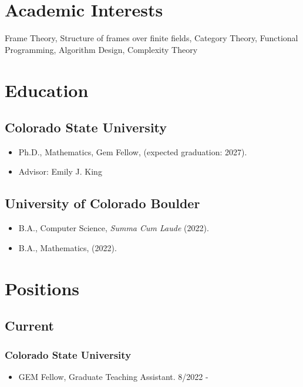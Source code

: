 \documentclass{cv_style}
\begin{document}

    \begin{center}  

    
	\end{center}
	
	\section{Academic Interests}
	Frame Theory, Structure of frames over finite fields, Category Theory, Functional Programming, Algorithm Design, Complexity Theory

	\section{Education}
		\subsection{Colorado State University}
				\begin{itemize}
					\item Ph.D., Mathematics, Gem Fellow, (expected graduation: 2027).
					\item Advisor: Emily J. King
				\end{itemize}
				
		\subsection{University of Colorado Boulder}
				\begin{itemize}
					\item B.A., Computer Science, \textit{Summa Cum Laude} (2022).
					\item B.A., Mathematics, (2022).
				\end{itemize}
	
	\section{Positions}
		\subsection{Current}
				\subsubsection*{Colorado State University}
					\begin{itemize}
						\item GEM Fellow, Graduate Teaching Assistant. 8/2022 -
					\end{itemize}
				
\end{document}
